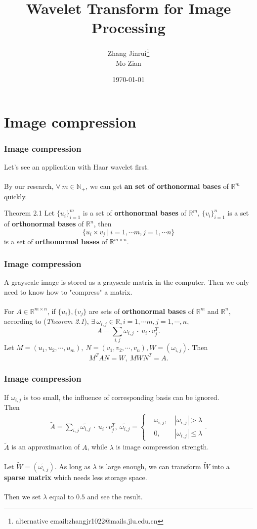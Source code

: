 \documentclass{beamer}
\title{Wavelet Transform for Image Processing}
\author{
\texorpdfstring{
Zhang Jinrui\thanks{alternative email:zhangjr1022@mails.jlu.edu.cn}
\\
Mo Zian
}
{
Zhang Jinrui\thanks{alternative email:zhangjr1022@mails.jlu.edu.cn}
,
Mo Zian
}
}
\date{\today}
\begin{document}
\frame{\titlepage}  %


\section{Image compression}
\begin{frame}
    \frametitle{Image compression}
    Let's see an application with Haar wavelet first.\\ \ \\
    By our research, $\forall\ m \in \mathbb{N}_{+}$, we can get \textbf{an set of orthonormal bases} of $\mathbb{R}^{m}$ quickly.
    \begin{block}{Theorem 2.1}
        Let $\{u_{i}\}_{i=1}^{m}$ is a set of \textbf{orthonormal bases} of $\mathbb{R}^{m}$, $\{v_{i}\}_{i=1}^{n}$ is a set of \textbf{orthonormal bases} of $\mathbb{R}^{n}$, then
        $$\{u_{i}\times v_{j}\ |\ i = 1,\cdots m, j=1,\cdots n\}$$
        is a set of \textbf{orthonormal bases} of $\mathbb{R}^{m\times n}$.
    \end{block}
\end{frame}
\begin{frame}
    \frametitle{Image compression}
    A grayscale image is stored as a grayscale matrix in the computer. Then we only need to know how to "{\color{blue}compress}" a matrix.\\ \ \\
    For $A \in \mathbb{R}^{m\times n}$, if $\{u_{i}\},\{v_{j}\}$ are sets of \textbf{orthonormal bases} of $\mathbb{R}^{m}$ and $\mathbb{R}^{n}$, according to (\textit{Theorem 2.1}),
    $\exists\ \omega_{i,j}\in\mathbb{R}, i = 1, \cdots m, j = 1, \cdots, n,$
    $$	A = \sum_{i,j}\omega_{i,j}\ \cdot \ u_{i} \cdot v_{j}^{T}.$$
    Let $M = (u_{1},u_{2},\cdots,u_{m}),\ N = (v_{1},v_{2},\cdots,v_{n}), W = (\omega_{i,j}).$ Then
    $$M^{T}AN =W,\ MWN^{T} = A.$$
\end{frame}
\begin{frame}
    \frametitle{Image compression}
    {\color{red}If $\omega_{i,j}$ is too small, the influence of  corresponding basis can be ignored.} \\Then
    \begin{align*}
        \widetilde{A} = \sum_{i,j}\widetilde{\omega_{i,j}}\ \cdot \ u_{i} \cdot v_{j}^{T},\ \widetilde{\omega_{i,j}} = \left\{
        \begin{aligned}
             & \omega_{i,j}, & \ |\omega_{i,j}| > \lambda    \\
             & 0,            & \ |\omega_{i,j}| \leq \lambda
        \end{aligned}
        \right..
    \end{align*}
    $\widetilde{A}$ is an approximation of $A$, while $\lambda$ is image compression strength.\\ \ \\
    Let $\widetilde{W} = (\widetilde{\omega_{i,j}}).$ As long as $\lambda$ is large enough, we can transform $\widetilde{W}$ into a \textbf{sparse matrix} which needs less storage space.\\ \ \\
    {\color{blue}Then we set $\lambda$ equal to $0.5$ and see the result.}
\end{frame}
\end{document}
